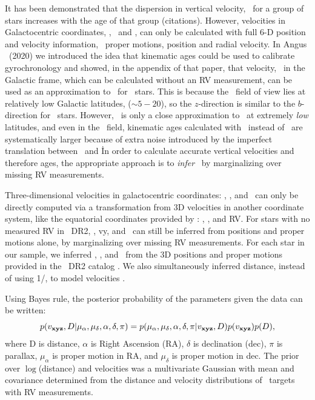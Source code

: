 It has been demonstrated that the dispersion in vertical velocity, \vz\, for a
group of stars increases with the age of that group (citations).
However, velocities in Galactocentric coordinates, \vx, \vy\ and \vz, can only
be calculated with full 6-D position and velocity information, \ie\ proper
motions, position and radial velocity.
In Angus \etal\ (2020) we introduced the idea that kinematic ages could be
used to calibrate gyrochronology and showed, in the appendix of that paper,
that velocity, \vb\ in the Galactic frame, which can be calculated without an
RV measurement, can be used as an approximation to \vz\ for \kepler\ stars.
This is because the \kepler\ field of view lies at relatively low Galactic
latitudes, ($\sim 5-20$\degrees), so the $z$-direction is similar to the
$b$-direction for \kepler\ stars.
However, \vb\ is only a close approximation to \vz\ at extremely {\it low}
latitudes, and even in the \kepler\ field, kinematic ages calculated with \vb\
instead of \vz\ are systematically larger because of extra noise introduced by
the imperfect translation between \vb\ and \vz\.
In order to calculate accurate vertical velocities and therefore ages, the
appropriate approach is to {\it infer} \vz\  by marginalizing over missing RV
measurements.

Three-dimensional velocities in galactocentric coordinates: \vx, \vy, and \vz\
can only be directly computed via a transformation from 3D velocities in
another coordinate system, like the equatorial coordinates provided by \gaia:
\mura, \mudec, and RV.
For stars with no measured RV in \gaia\ DR2, \vx, vy, and \vz\ can still be
inferred from positions and proper motions alone, by marginalizing over
missing RV measurements.
For each star in our sample, we inferred \vx, \vy, and \vz\ from the 3D
positions and proper motions provided in the \gaia\ DR2 catalog
\citep{brown2011}.
We also simultaneously inferred distance, instead of using 1/\parallax, to
model velocities \citep{bailer-jones2015, bailer-jones2018}.

Using Bayes rule, the posterior probability of the parameters given the data
can be written:
\begin{equation}
p(v_{\bf xyz}, D | \mu_{\alpha}, \mu_{\delta}, \alpha, \delta, \pi) =
    p(\mu_{\alpha}, \mu_{\delta}, \alpha, \delta, \pi | v_{\bf xyz}, D)
    p(v_{\bf xyz}) p(D),
\end{equation}
where D is distance, $\alpha$ is Right Ascension (RA), $\delta$ is declination
(dec), $\pi$ is parallax, $\mu_\alpha$ is proper motion in RA, and
$\mu_\delta$ is proper motion in dec.
The prior over $\log$(distance) and velocities was a multivariate Gaussian
with mean and covariance determined from the distance and velocity
distributions of \kepler\ targets with RV measurements.


